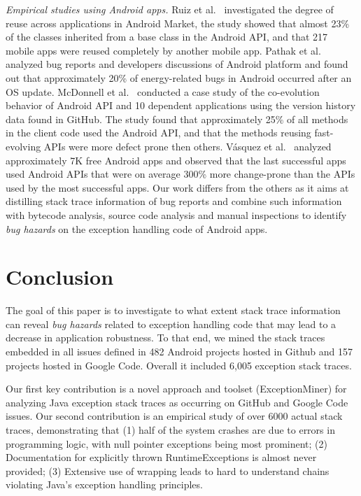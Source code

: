 \documentclass[conference]{IEEEtran}
\begin{document}
\textit{Empirical studies using Android apps.} Ruiz et al.~\cite{Ruiz12}
investigated the degree of reuse across applications in Android Market, the
study showed that almost 23\% of the classes inherited from a base class in the
Android API, and that 217 mobile apps were reused completely by another mobile
app. Pathak et al.~\cite{Patha11} analyzed bug reports and developers
discussions of Android platform and found out that approximately 20\% of
energy-related bugs in Android occurred after an OS update. McDonnell et
al.~\cite{McDon13} conducted a case study of the co-evolution behavior of
Android API and 10 dependent applications using the version history data found
in GitHub. The study found that approximately 25\% of all methods in the client
code used the Android API, and that the methods reusing fast-evolving APIs were
more defect prone then others. Vásquez et al.~\cite{Linar13} analyzed
approximately 7K free Android apps and observed that the last successful apps
used Android APIs that were on average 300\% more change-prone than the APIs
used by the most successful apps. Our work differs from the others as it aims at
distilling stack trace information of bug reports and combine such information
with bytecode analysis, source code analysis and manual inspections
to identify \emph{bug hazards} on the exception handling code of Android apps.



\section{Conclusion}
\label{sec:conc}

The goal of this paper is to investigate 
to what extent stack trace information can reveal \emph{bug hazards} 
related to exception handling code that may lead to a decrease in
application robustness. 
To that end, we mined the stack 
traces embedded in all issues defined in 482 Android projects hosted in Github and 
157 projects hosted in Google Code. Overall it included 6,005
exception stack traces.

Our first key contribution is
a novel approach and toolset (ExceptionMiner) for analyzing Java
  exception stack traces as occurring on GitHub and Google Code
  issues.
Our second contribution is
an empirical study of over 6000 actual stack traces,
  demonstrating that (1) half of the system crashes are due to errors
  in programming logic, with null pointer exceptions being most
  prominent;
  (2) Documentation for explicitly thrown RuntimeExceptions is almost
  never provided; 
  (3) Extensive use of wrapping leads to hard to understand chains
  violating Java's exception handling principles.
\end{document}

